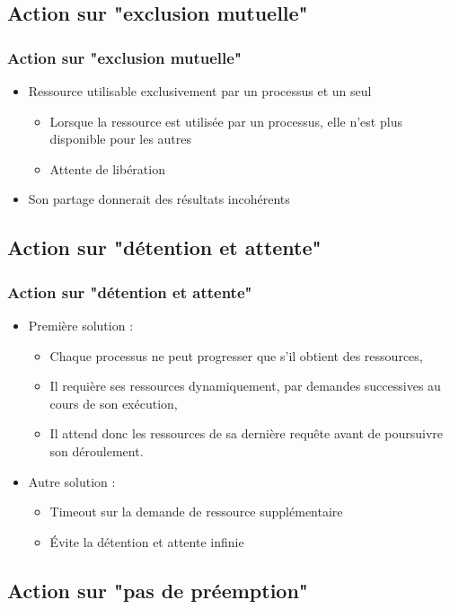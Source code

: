 \subsection{Action sur "exclusion mutuelle"}

\begin{frame}
\frametitle{Action sur "exclusion mutuelle"}
\begin{itemize}
\item Ressource utilisable exclusivement par un processus et un seul
\begin{itemize}
\item Lorsque la ressource est utilisée par un processus, elle n’est plus disponible pour les autres
\item Attente de libération
\end{itemize}
\item Son partage donnerait des résultats incohérents
\end{itemize}
\end{frame}


\subsection{Action sur "détention et attente"}
\begin{frame}
\frametitle{Action sur "détention et attente"}
\begin{itemize}
\item Première solution :
\begin{itemize}
\item Chaque processus ne peut progresser que s’il obtient des ressources,
\item Il requière ses ressources dynamiquement, par demandes successives au cours de son exécution,
\item Il attend donc les ressources de sa dernière requête avant de poursuivre son déroulement.
\end{itemize}
\item Autre solution :
\begin{itemize}
\item Timeout sur la demande de ressource supplémentaire
\item Évite la détention et attente infinie 
\end{itemize}
\end{itemize}

\end{frame}

\subsection{Action sur "pas de préemption"}

